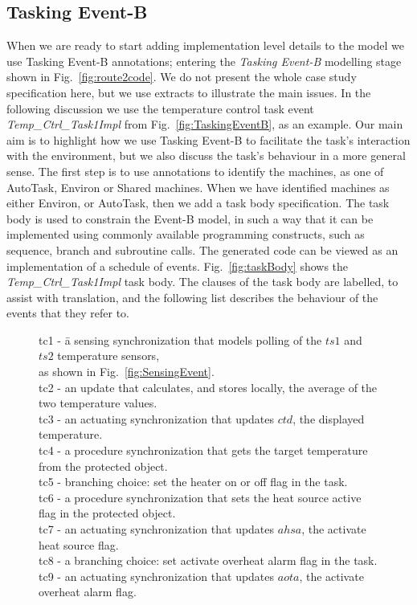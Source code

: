 \subsection{Tasking Event-B}
When we are ready to start adding implementation level details to the model we use Tasking Event-B annotations; entering the \emph{Tasking Event-B} modelling stage shown in Fig.~\ref{fig:route2code}. We do not present the whole case study specification here, but we use extracts to illustrate the main issues. In the following discussion we use the temperature control task event \emph{Temp\_Ctrl\_Task1Impl} from Fig.~\ref{fig:TaskingEventB}, as an example. Our main aim is to highlight how we use Tasking Event-B to facilitate the task's interaction with the environment, but we also discuss the task's behaviour in a more general sense. The first step is to use annotations to identify the machines, as one of AutoTask, Environ or Shared machines. When we have identified machines as either Environ, or AutoTask, then we add a task body specification. The task body is used to constrain the Event-B model, in such a way that it can be implemented using commonly available programming constructs, such as sequence, branch and subroutine calls. The generated code can be viewed as an implementation of a schedule of events. Fig.~\ref{fig:taskBody} shows the \emph{Temp\_Ctrl\_Task1Impl} task body. The clauses of the task body are labelled, to assist with translation, and the following list describes the behaviour of the events  that they refer to.
%
\begin{figure}[h]
\centering
\begin{minipage}{\textwidth}
\begin{tabbing}
tc1 - \=a sensing synchronization that models polling of the $ts1$ and $ts2$  temperature sensors,\\
 \>as shown in Fig.~\ref{fig:SensingEvent}. \\
tc2 - \>an update that calculates, and stores locally, the average of the two temperature values. \\
tc3 - \>an actuating synchronization that updates $ctd$, the displayed temperature. \\
tc4 - \>a procedure synchronization that gets the target temperature from the protected object. \\
tc5 - \>branching choice: set the heater on or off flag in the task. \\
tc6 - \>a procedure synchronization that sets the heat source active flag in the protected object. \\
tc7 - \>an actuating synchronization that updates $ahsa$, the activate heat source flag. \\
tc8 - \>a branching choice: set activate overheat alarm flag in the task. \\
tc9 - \>an actuating synchronization that updates $aota$, the activate overheat alarm flag. 
\end{tabbing}
\end{minipage}
\end{figure}
